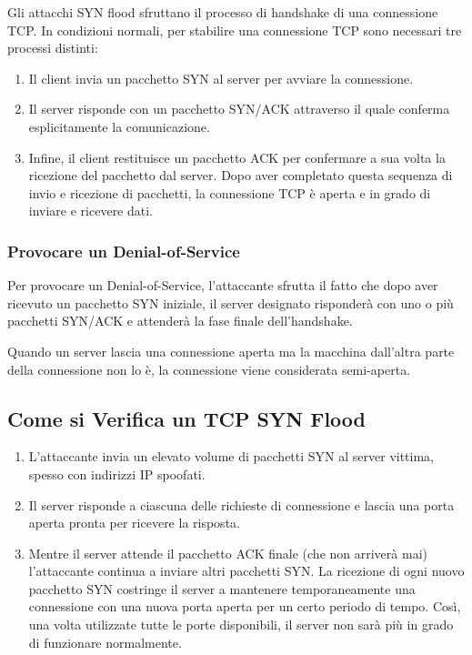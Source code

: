 Gli attacchi SYN flood sfruttano il processo di handshake di una connessione TCP. In condizioni normali, per stabilire una connessione TCP sono necessari tre processi distinti:

\begin{enumerate}
    \item Il client invia un pacchetto SYN al server per avviare la connessione.
    \item Il server risponde con un pacchetto SYN/ACK attraverso il quale conferma esplicitamente la comunicazione.
    \item Infine, il client restituisce un pacchetto ACK per confermare a sua volta la ricezione del pacchetto dal server. Dopo aver completato questa sequenza di invio e ricezione di pacchetti, la connessione TCP è aperta e in grado di inviare e ricevere dati.
\end{enumerate}

\subsubsection{Provocare un Denial-of-Service}

Per provocare un Denial-of-Service, l'attaccante sfrutta il fatto che dopo aver ricevuto un pacchetto SYN iniziale, il server designato risponderà con uno o più pacchetti SYN/ACK e attenderà la fase finale dell'handshake.

Quando un server lascia una connessione aperta ma la macchina dall'altra parte della connessione non lo è, la connessione viene considerata semi-aperta.

\subsection{Come si Verifica un TCP SYN Flood}

\begin{enumerate}
    \item L'attaccante invia un elevato volume di pacchetti SYN al server vittima, spesso con indirizzi IP spoofati.
    \item Il server risponde a ciascuna delle richieste di connessione e lascia una porta aperta pronta per ricevere la risposta.
    \item Mentre il server attende il pacchetto ACK finale (che non arriverà mai) l'attaccante continua a inviare altri pacchetti SYN. La ricezione di ogni nuovo pacchetto SYN costringe il server a mantenere temporaneamente una connessione con una nuova porta aperta per un certo periodo di tempo. Così, una volta utilizzate tutte le porte disponibili, il server non sarà più in grado di funzionare normalmente.
\end{enumerate}

